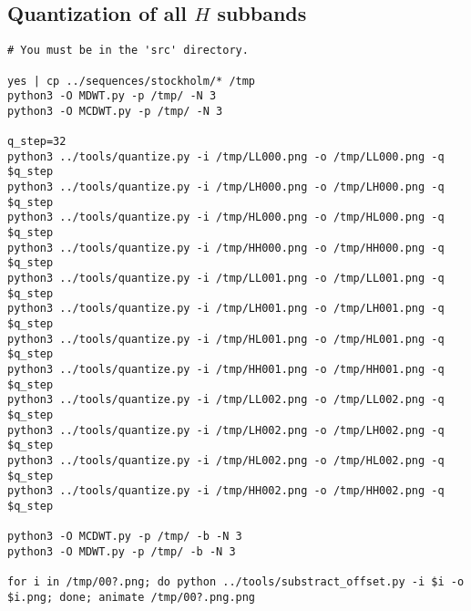 
\subsection{Quantization of all $H$ subbands}
\begin{verbatim}
# You must be in the 'src' directory.

yes | cp ../sequences/stockholm/* /tmp
python3 -O MDWT.py -p /tmp/ -N 3
python3 -O MCDWT.py -p /tmp/ -N 3

q_step=32
python3 ../tools/quantize.py -i /tmp/LL000.png -o /tmp/LL000.png -q $q_step
python3 ../tools/quantize.py -i /tmp/LH000.png -o /tmp/LH000.png -q $q_step
python3 ../tools/quantize.py -i /tmp/HL000.png -o /tmp/HL000.png -q $q_step
python3 ../tools/quantize.py -i /tmp/HH000.png -o /tmp/HH000.png -q $q_step
python3 ../tools/quantize.py -i /tmp/LL001.png -o /tmp/LL001.png -q $q_step
python3 ../tools/quantize.py -i /tmp/LH001.png -o /tmp/LH001.png -q $q_step
python3 ../tools/quantize.py -i /tmp/HL001.png -o /tmp/HL001.png -q $q_step
python3 ../tools/quantize.py -i /tmp/HH001.png -o /tmp/HH001.png -q $q_step
python3 ../tools/quantize.py -i /tmp/LL002.png -o /tmp/LL002.png -q $q_step
python3 ../tools/quantize.py -i /tmp/LH002.png -o /tmp/LH002.png -q $q_step
python3 ../tools/quantize.py -i /tmp/HL002.png -o /tmp/HL002.png -q $q_step
python3 ../tools/quantize.py -i /tmp/HH002.png -o /tmp/HH002.png -q $q_step

python3 -O MCDWT.py -p /tmp/ -b -N 3
python3 -O MDWT.py -p /tmp/ -b -N 3

for i in /tmp/00?.png; do python ../tools/substract_offset.py -i $i -o $i.png; done; animate /tmp/00?.png.png
\end{verbatim}

